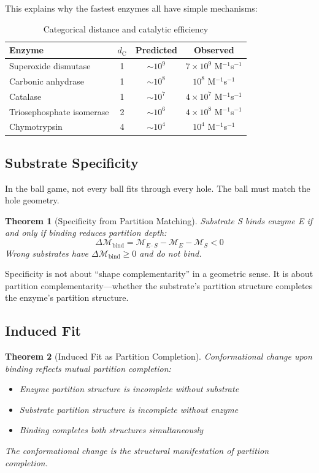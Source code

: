 ﻿\documentclass[twocolumn,10pt,a4paper]{article}
\newtheorem{theorem}{Theorem}[section]
\theoremstyle{definition}
\theoremstyle{remark}
\newcommand{\Depth}{\mathcal{M}}
\newcommand{\dC}{d_{\mathrm{C}}}
\begin{document}
This explains why the fastest enzymes all have simple mechanisms:

\begin{table}[h]
\centering
\caption{Categorical distance and catalytic efficiency}
\label{tab:efficiency}
\begin{tabular}{lccc}
\toprule
Enzyme & $\dC$ & Predicted & Observed \\
\midrule
Superoxide dismutase & 1 & $\sim 10^9$ & $7 \times 10^9$ M$^{-1}$s$^{-1}$ \\
Carbonic anhydrase & 1 & $\sim 10^8$ & $10^8$ M$^{-1}$s$^{-1}$ \\
Catalase & 1 & $\sim 10^7$ & $4 \times 10^7$ M$^{-1}$s$^{-1}$ \\
Triosephosphate isomerase & 2 & $\sim 10^6$ & $4 \times 10^8$ M$^{-1}$s$^{-1}$ \\
Chymotrypsin & 4 & $\sim 10^4$ & $10^4$ M$^{-1}$s$^{-1}$ \\
\bottomrule
\end{tabular}
\end{table}

\subsection{Substrate Specificity}

In the ball game, not every ball fits through every hole. The ball must match the hole geometry.

\begin{theorem}[Specificity from Partition Matching]
\label{thm:specificity}
Substrate S binds enzyme E if and only if binding reduces partition depth:
\begin{equation}
    \Delta\Depth_{\mathrm{bind}} = \Depth_{E \cdot S} - \Depth_E - \Depth_S < 0
\end{equation}
Wrong substrates have $\Delta\Depth_{\mathrm{bind}} \geq 0$ and do not bind.
\end{theorem}

Specificity is not about ``shape complementarity'' in a geometric sense. It is about partition complementarity---whether the substrate's partition structure completes the enzyme's partition structure.

\subsection{Induced Fit}

\begin{theorem}[Induced Fit as Partition Completion]
\label{thm:induced}
Conformational change upon binding reflects mutual partition completion:
\begin{itemize}
    \item Enzyme partition structure is incomplete without substrate
    \item Substrate partition structure is incomplete without enzyme
    \item Binding completes both structures simultaneously
\end{itemize}
The conformational change is the structural manifestation of partition completion.
\end{theorem}
\end{document}
